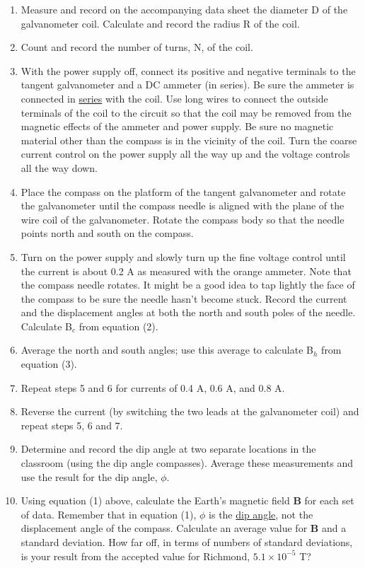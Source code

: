 \begin{enumerate}
\item Measure and record on the accompanying data sheet the diameter D of
the galvanometer coil. Calculate and record the radius R of the coil.
\item Count and record the number of turns, N, of the coil.
\item With the power supply off, connect its positive and negative terminals 
to the tangent galvanometer and  a DC ammeter (in series). 
Be sure the ammeter is connected in \underline{series} with 
the coil. Use long wires to connect the outside terminals of the coil
to the circuit so that the coil may be removed from the magnetic effects
of the ammeter and power supply. Be sure no magnetic material other
than the compass is in the vicinity of the coil. Turn the coarse current 
control on the power supply all the way up and the voltage controls all the 
way down.
\item Place the compass on the platform of the tangent galvanometer and rotate  
the galvanometer until the compass needle is aligned with the plane of the wire 
coil of the galvanometer. Rotate the compass body so that the needle points 
north and south on the compass.
\item Turn on the power supply and slowly turn up the fine voltage control 
until the current is about 0.2 A as measured with the orange ammeter.
Note that the compass needle rotates. It might be a good idea to tap
lightly the face of the compass to be sure the needle hasn't become
stuck. Record the current and the displacement angles at both the
north and south poles of the needle. Calculate B\( _{c} \) from equation (2).
\item Average the north and south angles; use this average to calculate 
B\( _{h} \) from equation (3).
\item Repeat steps 5 and 6 for currents of 0.4 A, 0.6 A, and 0.8 A.
\item Reverse the current (by switching the two leads at the galvanometer coil)
 and repeat steps 5, 6 and 7.
\item Determine and record the dip angle at two separate locations in the 
classroom (using the dip angle compasses). Average these measurements and use 
the result for the dip angle, \( \phi  \).
\item Using equation (1) above, calculate the Earth's magnetic field 
\textbf{B} for each set of data. Remember that in equation (1), \( \phi  \) 
is the \underline{dip angle}, not the displacement angle of the compass.
Calculate an average value for \textbf{B} and a standard deviation.
How far off, in terms of numbers of standard deviations, is your result
from the accepted value for Richmond, $5.1 \times 10^{-5}$ T?
\end{enumerate}
\hrulefill

